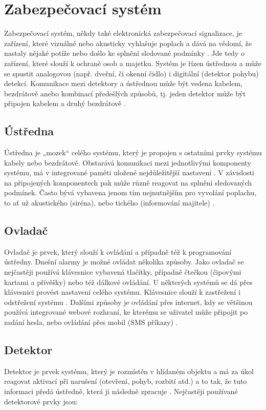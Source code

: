 \documentclass[FM,DP]{tulthesis}  %
\begin{document}
\section{Zabezpečovací systém}
Zabezpečovací systém, někdy také elektronická zabezpečovací signalizace, je zařízení, které vizuálně nebo akusticky vyhlašuje poplach a dává na vědomí, že nastaly nějaké potíže nebo došlo ke splnění sledované podmínky \cite{Security alarm}. Jde tedy o zařízení, které slouží k ochraně osob a majetku. Systém je řízen ústřednou a může se spustit analogovou (např. dveřní, či okenní čidlo) i digitální (detektor pohybu) detekcí. Komunikace mezi detektory a ústřednou může být vedena kabelem, bezdrátově anebo kombinací předešlých způsobů, tj. jeden detektor může být připojen kabelem a druhý bezdrátově \cite{Electronic security system}.

\subsection{Ústředna}
Ústředna je „mozek“ celého systému, který je propojen s ostatními prvky systému kabely nebo bezdrátově. Obstarává komunikaci mezi jednotlivými komponenty systému, má v integrované paměti uložené nejdůležitější nastavení \cite{Electronic security system}. V závislosti na připojených komponentech pak může různě reagovat na splnění sledovaných podmínek. Často bývá vybavena jenom tím nejnutnějším pro vyvolání poplachu, to ať už akustického (siréna), nebo tichého (informování majitele) \cite{Security alarm}.

\subsection{Ovladač}
Ovladač je prvek, který slouží k ovládání a případně též k programování ústředny. Dnešní alarmy je možné ovládat několika způsoby. Jako ovladač se nejčastěji používá klávesnice vybavená tlačítky, případně čtečkou (čipovými kartami a přívěšky) nebo též dálkové ovládání. U některých systémů se dá přes klávesnici provést nastavení celého systému. Klávesnice slouží k zastřežení i odstřežení systému \cite{Electronic security signalisation}. Dalšími způsoby je ovládání přes internet, kdy se většinou používá integrované webové rozhraní, ke kterému se uživatel může připojit po zadání hesla, nebo ovládání přes mobil (SMS příkazy) \cite{Bachelor thesis}.

\subsection{Detektor}
Detektor je prvek systému, který je rozmístěn v hlídaném objektu a má za úkol reagovat aktivací při narušení (otevření, pohyb, rozbití atd.) a to tak, že tuto informaci předá ústředně, která ji následně zpracuje \cite{Electronic security signalisation}. Nejčastěji používané detektorové prvky jsou:
\end{document}
